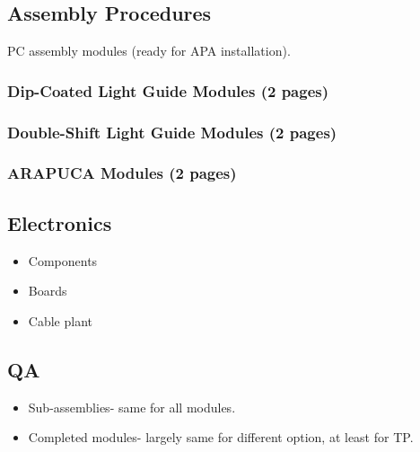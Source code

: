 \subsection{Assembly Procedures}
\label{sec:fdsp-pd-assy-ap}

PC assembly modules (ready for APA installation).


\subsubsection{Dip-Coated Light Guide Modules (2 pages)}
\label{ssec:fdsp-pd-pc-assy-bar1}

\subsubsection{Double-Shift Light Guide Modules (2 pages)}
\label{ssec:fdsp-pd-pc-assy-bar2}

\subsubsection{ARAPUCA Modules (2 pages)}
\label{ssec:fdsp-pd-pc-assy-arapuca}


\subsection{Electronics}
\label{sec:fdsp-pd-assy-pde}


\begin{itemize}
\item Components
\item Boards
\item Cable plant
\end{itemize}

\subsection{QA}
\label{sec:fdsp-pd-assy-qa}

\begin{itemize}
\item Sub-assemblies- same for all modules.
\item Completed modules- largely same for different option, at least for TP.
\end{itemize}

